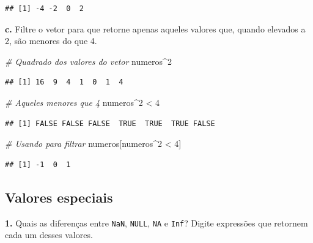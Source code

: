 \documentclass[
]{book}
\newenvironment{Shaded}{\begin{snugshade}}{\end{snugshade}}
\newcommand{\CommentTok}[1]{\textcolor[rgb]{0.56,0.35,0.01}{\textit{#1}}}
\newcommand{\DecValTok}[1]{\textcolor[rgb]{0.00,0.00,0.81}{#1}}
\newcommand{\NormalTok}[1]{#1}
\newcommand{\SpecialCharTok}[1]{\textcolor[rgb]{0.00,0.00,0.00}{#1}}
\begin{document}
\begin{verbatim}
## [1] -4 -2  0  2
\end{verbatim}

\textbf{c.} Filtre o vetor para que retorne apenas aqueles valores que, quando elevados a 2, são menores do que 4.

\begin{Shaded}
\begin{Highlighting}[]
\CommentTok{\# Quadrado dos valores do vetor}
\NormalTok{numeros}\SpecialCharTok{\^{}}\DecValTok{2}
\end{Highlighting}
\end{Shaded}

\begin{verbatim}
## [1] 16  9  4  1  0  1  4
\end{verbatim}

\begin{Shaded}
\begin{Highlighting}[]
\CommentTok{\# Aqueles menores que 4}
\NormalTok{numeros}\SpecialCharTok{\^{}}\DecValTok{2} \SpecialCharTok{\textless{}} \DecValTok{4}
\end{Highlighting}
\end{Shaded}

\begin{verbatim}
## [1] FALSE FALSE FALSE  TRUE  TRUE  TRUE FALSE
\end{verbatim}

\begin{Shaded}
\begin{Highlighting}[]
\CommentTok{\# Usando para filtrar}
\NormalTok{numeros[numeros}\SpecialCharTok{\^{}}\DecValTok{2} \SpecialCharTok{\textless{}} \DecValTok{4}\NormalTok{]}
\end{Highlighting}
\end{Shaded}

\begin{verbatim}
## [1] -1  0  1
\end{verbatim}

\hypertarget{valores-especiais}{%
\subsection*{Valores especiais}\label{valores-especiais}}

\textbf{1.} Quais as diferenças entre \texttt{NaN}, \texttt{NULL}, \texttt{NA} e \texttt{Inf}? Digite expressões que retornem cada um desses valores.
\end{document}
